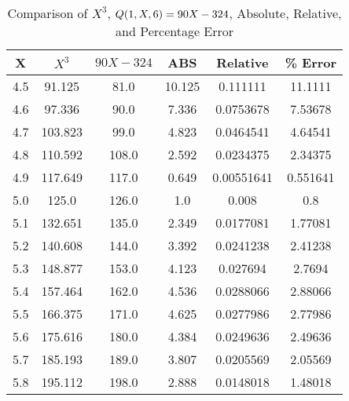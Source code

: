 ﻿\begin{table}[h!]
    \centering
    \caption{Comparison of $X^3$, ${Q}(1,X,6) = 90X-324$, Absolute, Relative, and Percentage Error}
    \begin{tabular}{|c|c|c|c|c|c|}
        \hline
        \textbf{X} & \textbf{$X^3$} & \textbf{$90X-324$} & \textbf{ABS} & \textbf{Relative} & \textbf{\% Error} \\ \hline
        4.5        & 91.125         & 81.0               & 10.125       & 0.111111          & 11.1111           \\ \hline
        4.6        & 97.336         & 90.0               & 7.336        & 0.0753678         & 7.53678           \\ \hline
        4.7        & 103.823        & 99.0               & 4.823        & 0.0464541         & 4.64541           \\ \hline
        4.8        & 110.592        & 108.0              & 2.592        & 0.0234375         & 2.34375           \\ \hline
        4.9        & 117.649        & 117.0              & 0.649        & 0.00551641        & 0.551641          \\ \hline
        5.0        & 125.0          & 126.0              & 1.0          & 0.008             & 0.8               \\ \hline
        5.1        & 132.651        & 135.0              & 2.349        & 0.0177081         & 1.77081           \\ \hline
        5.2        & 140.608        & 144.0              & 3.392        & 0.0241238         & 2.41238           \\ \hline
        5.3        & 148.877        & 153.0              & 4.123        & 0.027694          & 2.7694            \\ \hline
        5.4        & 157.464        & 162.0              & 4.536        & 0.0288066         & 2.88066           \\ \hline
        5.5        & 166.375        & 171.0              & 4.625        & 0.0277986         & 2.77986           \\ \hline
        5.6        & 175.616        & 180.0              & 4.384        & 0.0249636         & 2.49636           \\ \hline
        5.7        & 185.193        & 189.0              & 3.807        & 0.0205569         & 2.05569           \\ \hline
        5.8        & 195.112        & 198.0              & 2.888        & 0.0148018         & 1.48018           \\ \hline

\end{tabular}
\end{table}
